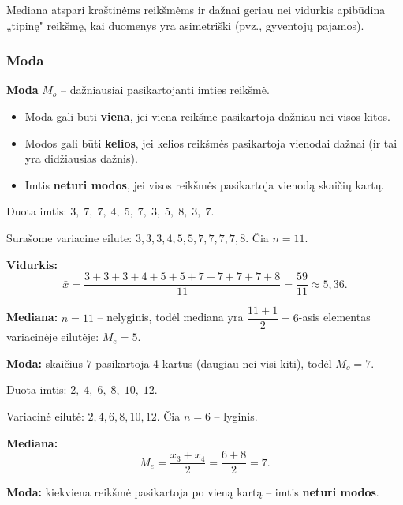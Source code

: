 \begin{remark}
Mediana atspari kraštinėms reikšmėms ir dažnai geriau nei vidurkis apibūdina
„tipinę" reikšmę, kai duomenys yra asimetriški (pvz., gyventojų pajamos).
\end{remark}

\subsubsection*{Moda}

\begin{definition}[Moda]
\textbf{Moda} $M_o$ – dažniausiai pasikartojanti imties reikšmė.
\begin{itemize}
  \item Moda gali būti \textbf{viena}, jei viena reikšmė pasikartoja dažniau nei
        visos kitos.
  \item Modos gali būti \textbf{kelios}, jei kelios reikšmės pasikartoja vienodai
        dažnai (ir tai yra didžiausias dažnis).
  \item Imtis \textbf{neturi modos}, jei visos reikšmės pasikartoja vienodą
        skaičių kartų.
\end{itemize}
\end{definition}

\begin{example}
Duota imtis: $3,\; 7,\; 7,\; 4,\; 5,\; 7,\; 3,\; 5,\; 8,\; 3,\; 7$.

Surašome variacine eilute: $3, 3, 3, 4, 5, 5, 7, 7, 7, 7, 8$. Čia $n = 11$.

\textbf{Vidurkis:}
\[
  \bar{x} = \frac{3+3+3+4+5+5+7+7+7+7+8}{11} = \frac{59}{11} \approx 5{,}36.
\]

\textbf{Mediana:} $n = 11$ – nelyginis, todėl mediana yra $\dfrac{11+1}{2} = 6$-asis
elementas variacinėje eilutėje: $M_e = 5$.

\textbf{Moda:} skaičius $7$ pasikartoja 4 kartus (daugiau nei visi kiti), todėl
$M_o = 7$.
\end{example}

\begin{example}
Duota imtis: $2,\; 4,\; 6,\; 8,\; 10,\; 12$.

Variacinė eilutė: $2, 4, 6, 8, 10, 12$. Čia $n = 6$ – lyginis.

\textbf{Mediana:}
\[
  M_e = \frac{x_3 + x_4}{2} = \frac{6 + 8}{2} = 7.
\]

\textbf{Moda:} kiekviena reikšmė pasikartoja po vieną kartą – imtis
\textbf{neturi modos}.
\end{example}

